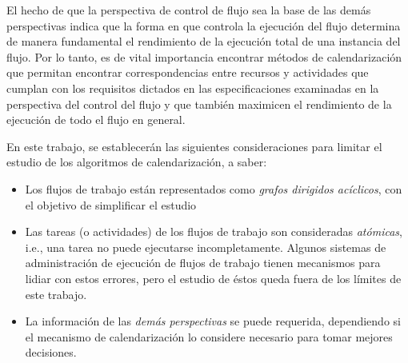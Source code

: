 El hecho de que la perspectiva de control de flujo sea la base de las demás perspectivas indica que la forma en que controla la ejecución del flujo determina de manera fundamental el rendimiento de la ejecución total de una instancia del flujo. Por lo tanto, es de vital importancia encontrar métodos de calendarización que permitan encontrar correspondencias entre recursos y actividades que cumplan con los requisitos dictados en las especificaciones examinadas en la perspectiva del control del flujo y que también maximicen el rendimiento de la ejecución de todo el flujo en general.

En este trabajo, se establecerán las siguientes consideraciones para limitar el estudio de los algoritmos de calendarización, a saber:

\begin{itemize}
\item{Los flujos de trabajo están representados como \emph{grafos dirigidos acíclicos}, con el objetivo de simplificar el estudio}

\item{Las tareas (o actividades) de los flujos de trabajo son consideradas \emph{atómicas}, i.e., una tarea no puede ejecutarse incompletamente. Algunos sistemas de administración de ejecución de flujos de trabajo tienen mecanismos para lidiar con estos errores, pero el estudio de éstos queda fuera de los límites de este trabajo.}

\item{La información de las \emph{demás perspectivas} se puede requerida, dependiendo si el mecanismo de calendarización lo considere necesario para tomar mejores decisiones.}
\end{itemize}









